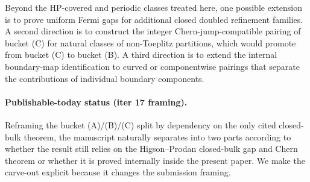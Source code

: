 \documentclass[11pt]{article}
\numberwithin{equation}{section}
\theoremstyle{definition}
\theoremstyle{remark}
\begin{document}
Beyond the HP-covered and periodic classes treated here, one possible extension is to prove
uniform Fermi gaps for additional closed doubled refinement families. A second direction is to
construct the integer Chern-jump-compatible pairing of bucket (C) for natural classes of
non-Toeplitz partitions, which would promote  from bucket (C) to
bucket (B). A third direction is to extend the internal boundary-map identification to curved
or componentwise pairings that separate the contributions of individual boundary components.

\paragraph{Publishable-today status (iter 17 framing).}
Reframing the bucket (A)/(B)/(C) split by dependency on the only cited closed-bulk theorem,
the manuscript naturally separates into two parts according to whether the result still relies
on the Higson--Prodan \cite{HigsonProdanUniversalPRL,HigsonProdanUniversalArxiv} closed-bulk
gap and Chern theorem or whether it is proved internally inside the present paper. We make the
carve-out explicit because it changes the submission framing.
\end{document}
